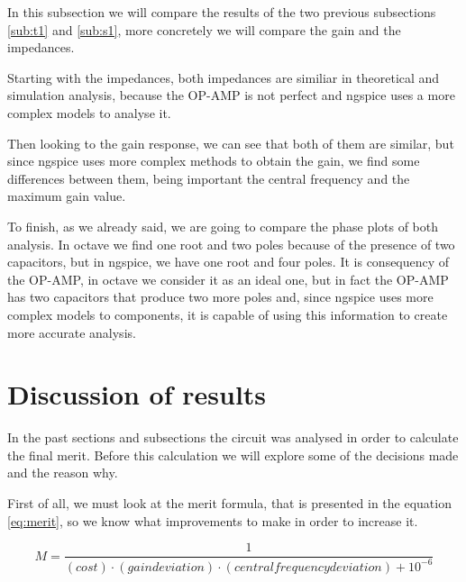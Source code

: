 In this subsection we will compare the results of the two previous subsections \ref{sub:t1} and \ref{sub:s1}, more concretely we will compare the gain and the impedances.
\par Starting with the impedances, both impedances are similiar in theoretical and simulation analysis, because the OP-AMP is not perfect and ngspice uses a more complex
models to analyse it.
\par Then looking to the gain response, we can see that both of them are similar, but since ngspice uses more complex methods to obtain the gain,
we find some differences between them, being important the central frequency and the maximum gain value. 
\par To finish, as we already said, we are going to compare the phase plots of both analysis. In octave we find one root and two poles because of the presence of two capacitors, but 
in ngspice, we have one root and four poles. It is consequency of the OP-AMP, in octave we consider it as an ideal one, but in fact the OP-AMP has two capacitors that produce
two more poles and, since ngspice uses more complex models to components, it is capable of using this information to create more accurate analysis.


\newpage
\section{Discussion of results}
\label {sec:aspects}

In the past sections and subsections the circuit was analysed in order to calculate the final merit. Before this calculation we will explore some of the decisions made and the reason why. 
\par First of all, we must look at the merit formula, that is presented in the equation \ref{eq:merit}, so we know what improvements to make in order to increase it. 

\begin{equation}
M=\frac{1}{(cost) \cdot (gain deviation) \cdot (central frequency deviation)+10^{-6}}
\label{eq:merit}
\end{equation}

